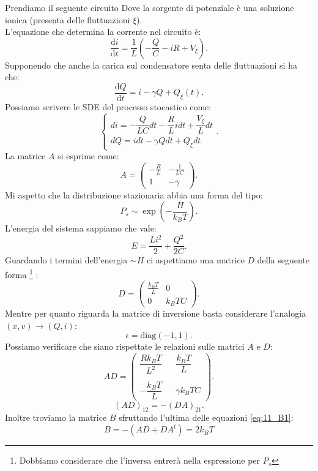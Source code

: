\begin{exmp}
    Prendiamo il seguente circuito
    Dove la sorgente di potenziale è una soluzione ionica (presenta delle fluttuazioni $\xi$).\\
    L'equazione che determina la corrente nel circuito è:
    \[
        \frac{\text{d} i}{\text{d} t} = \frac{1}{L}\left(-\frac{Q}{C}-iR +V_\xi\right)
    .\] 
    Supponendo che anche la carica sul condensatore senta delle fluttuazioni si ha che:
    \[
	\frac{\text{d} Q}{\text{d} t} = i - \gamma Q + Q_\xi(t) 
    .\] 
    Possiamo scrivere le SDE del processo stocastico come:
    \[
       \begin{cases}
 	 di = - \dfrac{Q}{LC}dt -\dfrac{R}{L}idt +\dfrac{V_\xi}{L}dt\\
	 dQ = idt - \gamma Q dt + Q_\xi dt          
       \end{cases} 
    .\] 
    La matrice $A$ si esprime come:
    \[
        A = 
	\begin{pmatrix} 
	    -\frac{R}{L} & -\frac{1}{LC}\\
	    1            & - \gamma
	\end{pmatrix} 
    .\] 
    Mi aspetto che la distribuzione stazionaria abbia una forma del tipo:
    \[
        P_s \sim \exp\left(-\frac{H}{k_BT}\right)
    .\] 
    L'energia del sistema sappiamo che vale:
    \[
        E = \frac{Li^2}{2} + \frac{Q^2}{2C}
    .\] 
    Guardando i termini dell'energia $\sim H$ ci aspettiamo una matrice $D$ della seguente forma
    \footnote{Dobbiamo considerare che l'inversa entrerà nella espressione per $P_s$}
    :
    \[
        D = 
	\begin{pmatrix}
	    \frac{k_BT}{L} & 0 \\
	    0              & k_BT C
	\end{pmatrix} 
    .\] 
    Mentre per quanto riguarda la matrice di inversione basta considerare l'analogia $(x,v) \to (Q,i)$:
    \[
	\epsilon  = \text{diag}(-1,1) 
    .\] 
    Possiamo verificare che siano rispettate le relazioni sulle matrici $A$ e $D$:
    \[
	AD = 
	\begin{pmatrix} 
	    \dfrac{Rk_BT}{L^2} & &  \dfrac{k_BT}{L}   \\
	     &&\\
	    - \dfrac{k_BT}{L} & & \gamma k_BTC 
	\end{pmatrix} 
    .\] 
    \[
	(AD)_{12} = -(DA)_{21} 
    .\] 
    Inoltre troviamo la matrice $B$ sfruttando l'ultima delle equazioni \ref{eq:11_B1}:
    \[
        B = -\left(AD+DA^t\right) = 2k_BT 
\]
\end{exmp}
